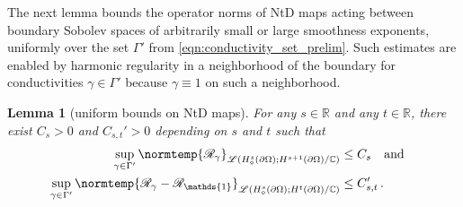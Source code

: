 \documentclass[pdflatex,sn-mathphys-num]{sn-jnl-preprint}
\newcommand{\R}{\mathbb{R}}
\newcommand{\C}{\mathbb{C}}
\newcommand{\sL}{\mathscr{L}}
\newcommand{\pOmega}{{\partial\Omega}}
\newcommand{\ntd}{\mathscr{R}_{\gamma}}
\newcommand{\norm}{\normtemp}
\newcommand{\onebm}{\mathds{1}} %
\def\qa{\quad\text{and}\quad}
\theoremstyle{thmstyleone}%
\newtheorem{lemma}[theorem]{Lemma}%
\theoremstyle{thmstyletwo}%
\theoremstyle{thmstylethree}%
\numberwithin{equation}{section}
\numberwithin{theorem}{section}
\begin{document}
The next lemma bounds the operator norms of NtD maps acting between boundary Sobolev spaces of arbitrarily small or large smoothness exponents, uniformly over the set $\Gamma'$ from \eqref{eqn:conductivity_set_prelim}. Such estimates are enabled by harmonic regularity in a neighborhood of the boundary for conductivities $\gamma\in\Gamma'$ because $\gamma\equiv 1$ on such a neighborhood. 
\begin{lemma}[uniform bounds on NtD maps]\label{lem:ntd_unif_op}
    For any $s\in\R$ and any $t\in\R$, there exist $C_s>0$ and $C_{s,t}'>0$ depending on $s$ and $t$ such that
    \begin{align}\label{eqn:ntd_unif_op}
        \begin{split}
            \sup_{\gamma\in\Gamma'}\norm{\ntd}_{\sL({H}_\diamond^s(\pOmega);H^{s+1}(\pOmega)/\C)}&\leq C_s \qa\\
            \sup_{\gamma\in\Gamma'}\norm{\ntd - \mathscr{R}_{\onebm}}_{\sL({H}_\diamond^s(\pOmega);H^{t}(\pOmega)/\C)}&\leq C_{s,t}'\,.
        \end{split}
    \end{align}
\end{lemma}
\end{document}
